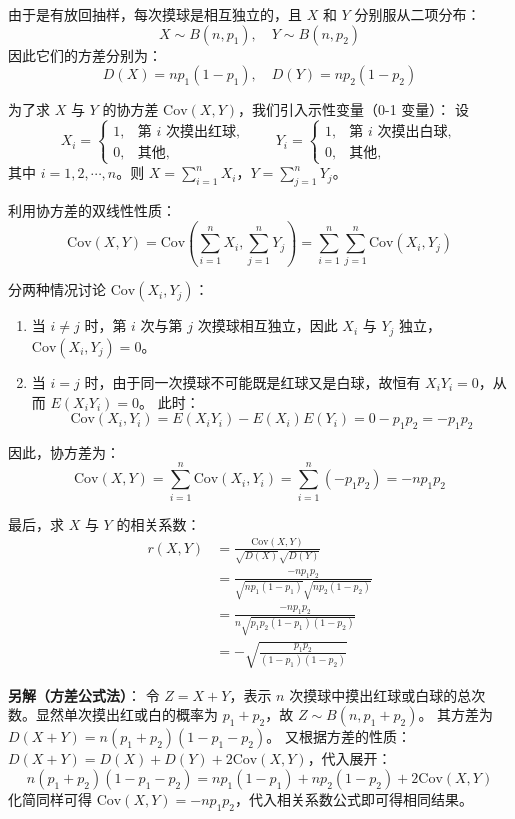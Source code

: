 ﻿\documentclass[lang=cn,11pt]{elegantbook}
\begin{document}
\begin{solution}
由于是有放回抽样，每次摸球是相互独立的，且 $X$ 和 $Y$ 分别服从二项分布：
\[
X \sim B(n, p_1), \quad Y \sim B(n, p_2)
\]
因此它们的方差分别为：
\[
D(X) = np_1(1-p_1), \quad D(Y) = np_2(1-p_2)
\]

为了求 $X$ 与 $Y$ 的协方差 $\text{Cov}(X,Y)$，我们引入示性变量（0-1 变量）：
设 
\[
X_i = \begin{cases}
1, & \text{第 } i \text{ 次摸出红球}, \\
0, & \text{其他},
\end{cases}
\qquad
Y_i = \begin{cases}
1, & \text{第 } i \text{ 次摸出白球}, \\
0, & \text{其他},
\end{cases}
\]
其中 $i = 1, 2, \cdots, n$。则 $X = \sum\limits_{i=1}^n X_i$，$Y = \sum\limits_{j=1}^n Y_j$。

利用协方差的双线性性质：
\[
\text{Cov}(X, Y) = \text{Cov}\left(\sum_{i=1}^n X_i, \sum_{j=1}^n Y_j\right) = \sum_{i=1}^n \sum_{j=1}^n \text{Cov}(X_i, Y_j)
\]

分两种情况讨论 $\text{Cov}(X_i, Y_j)$：
\begin{enumerate}
    \item[(1)] 当 $i \neq j$ 时，第 $i$ 次与第 $j$ 次摸球相互独立，因此 $X_i$ 与 $Y_j$ 独立，$\text{Cov}(X_i, Y_j) = 0$。
    \item[(2)] 当 $i = j$ 时，由于同一次摸球不可能既是红球又是白球，故恒有 $X_i Y_i = 0$，从而 $E(X_i Y_i) = 0$。
    此时：
    \[
    \text{Cov}(X_i, Y_i) = E(X_i Y_i) - E(X_i)E(Y_i) = 0 - p_1 p_2 = -p_1 p_2
    \]
\end{enumerate}

因此，协方差为：
\[
\text{Cov}(X,Y) = \sum_{i=1}^n \text{Cov}(X_i, Y_i) = \sum_{i=1}^n (-p_1 p_2) = -n p_1 p_2
\]

最后，求 $X$ 与 $Y$ 的相关系数：
\begin{align*}
r(X,Y) &= \frac{\text{Cov}(X,Y)}{\sqrt{D(X)} \sqrt{D(Y)}} \\[6pt]
&= \frac{-n p_1 p_2}{\sqrt{np_1(1-p_1)} \sqrt{np_2(1-p_2)}} \\[6pt]
&= \frac{-n p_1 p_2}{n \sqrt{p_1 p_2 (1-p_1)(1-p_2)}} \\[6pt]
&= -\sqrt{\frac{p_1 p_2}{(1-p_1)(1-p_2)}}
\end{align*}

\textbf{另解（方差公式法）}：
令 $Z = X + Y$，表示 $n$ 次摸球中摸出红球或白球的总次数。显然单次摸出红或白的概率为 $p_1 + p_2$，故 $Z \sim B(n, p_1+p_2)$。
其方差为 $D(X+Y) = n(p_1+p_2)(1 - p_1 - p_2)$。
又根据方差的性质：$D(X+Y) = D(X) + D(Y) + 2\text{Cov}(X,Y)$，代入展开：
\[
n(p_1+p_2)(1 - p_1 - p_2) = np_1(1-p_1) + np_2(1-p_2) + 2\text{Cov}(X,Y)
\]
化简同样可得 $\text{Cov}(X,Y) = -n p_1 p_2$，代入相关系数公式即可得相同结果。
\end{solution}
\end{document}
